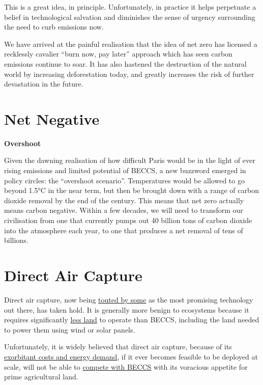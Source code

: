 \documentclass[
]{book}
\begin{document}
This is a great idea, in principle. Unfortunately, in practice it helps perpetuate a belief in technological salvation and diminishes the sense of urgency surrounding the need to curb emissions now.

We have arrived at the painful realisation that the idea of net zero has licensed a recklessly cavalier ``burn now, pay later'' approach which has seen carbon emissions continue to soar. It has also hastened the destruction of the natural world by increasing deforestation today, and greatly increases the risk of further devastation in the future.

\hypertarget{net-negative}{%
\section{Net Negative}\label{net-negative}}

\textbf{Overshoot}

Given the dawning realisation of how difficult Paris would be in the light of ever rising emissions and limited potential of BECCS, a new buzzword emerged in policy circles: the ``overshoot scenario''. Temperatures would be allowed to go beyond 1.5°C in the near term, but then be brought down with a range of carbon dioxide removal by the end of the century. This means that net zero actually means carbon negative. Within a few decades, we will need to transform our civilisation from one that currently pumps out 40 billion tons of carbon dioxide into the atmosphere each year, to one that produces a net removal of tens of billions.

\hypertarget{direct-air-capture}{%
\section{Direct Air Capture}\label{direct-air-capture}}

Direct air capture, now being \href{https://www.wri.org/blog/2020/03/to-unlock-the-potential-of-direct-air-capture-we-must-invest-now}{touted by some} as the most promising technology out there, has taken hold. It is generally more benign to ecosystems because it requires significantly \href{https://hoffmanncentre.chathamhouse.org/article/betting-on-beccs-exploring-land-based-negative-emissions-technologies/}{less land} to operate than BECCS, including the land needed to power them using wind or solar panels.

Unfortunately, it is widely believed that direct air capture, because of its \href{https://www.wri.org/blog/2021/01/direct-air-capture-definition-cost-considerations}{exorbitant costs and energy demand}, if it ever becomes feasible to be deployed at scale, will not be able to \href{https://www.nature.com/articles/s41558-020-0885-y}{compete with BECCS} with its voracious appetite for prime agricultural land.
\end{document}
